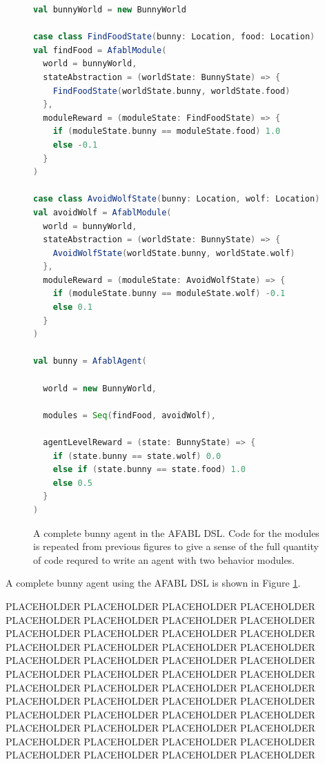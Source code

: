 \begin{figure}[ht]
\begin{center}

\begin{lstlisting}[language=Scala]
val bunnyWorld = new BunnyWorld

case class FindFoodState(bunny: Location, food: Location)
val findFood = AfablModule(
  world = bunnyWorld,
  stateAbstraction = (worldState: BunnyState) => {
    FindFoodState(worldState.bunny, worldState.food)
  },
  moduleReward = (moduleState: FindFoodState) => {
    if (moduleState.bunny == moduleState.food) 1.0
    else -0.1
  }
)

case class AvoidWolfState(bunny: Location, wolf: Location)
val avoidWolf = AfablModule(
  world = bunnyWorld,
  stateAbstraction = (worldState: BunnyState) => {
    AvoidWolfState(worldState.bunny, worldState.wolf)
  },
  moduleReward = (moduleState: AvoidWolfState) => {
    if (moduleState.bunny == moduleState.wolf) -0.1
    else 0.1
  }
)

val bunny = AfablAgent(

  world = new BunnyWorld,

  modules = Seq(findFood, avoidWolf),

  agentLevelReward = (state: BunnyState) => {
    if (state.bunny == state.wolf) 0.0
    else if (state.bunny == state.food) 1.0
    else 0.5
  }
)
\end{lstlisting}

\caption{A complete bunny agent in the AFABL DSL. Code for the modules is repeated from previous figures to give a sense of the full quantity of code requred to write an agent with two behavior modules.}
\end{center}
\label{fig:afabl-bunny-code}
\end{figure}

A complete bunny agent using the AFABL DSL is shown in Figure \ref{fig:afabl-bunny-code}.

PLACEHOLDER PLACEHOLDER PLACEHOLDER PLACEHOLDER PLACEHOLDER PLACEHOLDER PLACEHOLDER PLACEHOLDER PLACEHOLDER PLACEHOLDER PLACEHOLDER PLACEHOLDER PLACEHOLDER PLACEHOLDER PLACEHOLDER PLACEHOLDER PLACEHOLDER PLACEHOLDER PLACEHOLDER PLACEHOLDER PLACEHOLDER PLACEHOLDER PLACEHOLDER PLACEHOLDER PLACEHOLDER PLACEHOLDER PLACEHOLDER PLACEHOLDER PLACEHOLDER PLACEHOLDER PLACEHOLDER PLACEHOLDER PLACEHOLDER PLACEHOLDER PLACEHOLDER PLACEHOLDER PLACEHOLDER PLACEHOLDER PLACEHOLDER PLACEHOLDER PLACEHOLDER PLACEHOLDER PLACEHOLDER PLACEHOLDER PLACEHOLDER PLACEHOLDER PLACEHOLDER PLACEHOLDER


